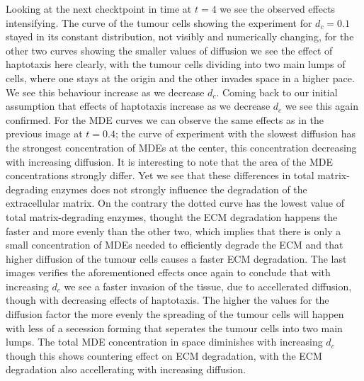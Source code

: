 Looking at the next checktpoint in time at $t=4$ we see the observed effects intensifying. The curve of the tumour cells showing the experiment for $d_c=0.1$ stayed in its constant distribution, not visibly and numerically changing, for the other two curves showing the smaller values of diffusion we see the effect of haptotaxis here clearly, with the tumour cells dividing into two main lumps of cells, where one stays at the origin and the other invades space in a higher pace. We see this behaviour increase as we decrease $d_c$. Coming back to our initial assumption that effects of haptotaxis increase as we decrease $d_c$ we see this again confirmed. For the MDE curves we can observe the same effects as in the previous image at $t=0.4$; the curve of experiment with the slowest diffusion has the strongest concentration of MDEs at the center, this concentration decreasing with increasing diffusion. It is interesting to note that the area of the MDE concentrations strongly differ. Yet we see that these differences in total matrix-degrading enzymes does not strongly influence the degradation of the extracellular matrix. On the contrary the dotted curve has the lowest value of total matrix-degrading enzymes, thought the ECM degradation happens the faster and more evenly than the other two, which implies that there is only a small concentration of MDEs needed to efficiently degrade the ECM and that higher diffusion of the tumour cells causes a faster ECM degradation. \newline 
The last images verifies the aforementioned effects once again to conclude that with increasing $d_c$ we see a faster invasion of the tissue, due to accellerated diffusion, though with decreasing effects of haptotaxis. The higher the values for the diffusion factor the more evenly the spreading of the tumour cells will happen with less of a secession forming that seperates the tumour cells into two main lumps. The total MDE concentration in space diminishes with increasing $d_c$ though this shows countering effect on ECM degradation, with the ECM degradation also accellerating with increasing diffusion.


